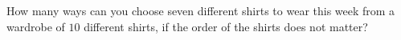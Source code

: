 How many ways can you choose seven different shirts to wear this week from a wardrobe of $10$ different shirts, if the order of the shirts does not matter?
